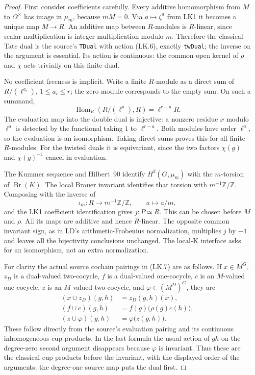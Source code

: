 \begin{proof}
First consider coefficients carefully.  Every additive homomorphism
from $M$ to $\Omega^\times$ has image in $\mu_m$, because $mM=0$.
Via $a\mapsto\zeta^a$ from LK1 it becomes a unique map $M\to R$.
An additive map between $R$-modules is $R$-linear, since scalar
multiplication is integer multiplication modulo $m$.  Therefore
the classical Tate dual is the source's \texttt{TDual} with action
(LK.6), exactly \texttt{twDual}; the inverse on the argument is
essential.  Its action is continuous: the common open kernel of
$\rho$ and $\chi$ acts trivially on this finite dual.

No coefficient freeness is implicit.  Write a finite $R$-module as
a direct sum of $R/(\ell^{a_i})$, $1\le a_i\le r$; the zero module
corresponds to the empty sum.  On such a summand,
\[
 \operatorname{Hom}_R(R/(\ell^a),R)=\ell^{r-a}R.
 \tag{LK.8}
\]
The evaluation map into the double dual is injective: a nonzero
residue $x$ modulo $\ell^a$ is detected by the functional taking
$1$ to $\ell^{r-a}$.  Both modules have order $\ell^a$, so the
evaluation is an isomorphism.  Taking direct sums proves this for
all finite $R$-modules.  For the twisted duals it is equivariant,
since the two factors $\chi(g)$ and $\chi(g)^{-1}$ cancel in
evaluation.

The Kummer sequence and Hilbert~90 identify
$H^2(G,\mu_m)$ with the $m$-torsion of $\operatorname{Br}(K)$.
The local Brauer invariant identifies that torsion with
$m^{-1}\mathbb Z/\mathbb Z$.  Composing with the inverse of
\[
 \iota_m:R\longrightarrow m^{-1}\mathbb Z/\mathbb Z,
 \qquad a\longmapsto a/m,
 \tag{LK.9}
\]
and the LK1 coefficient identification gives $j:P\simeq R$.
This can be chosen before $M$ and $\rho$.  All its maps are additive
and hence $R$-linear.  The opposite common invariant sign, as in
LD's arithmetic-Frobenius normalization, multiplies $j$ by $-1$ and
leaves all the bijectivity conclusions unchanged.  The local-K
interface asks for an isomorphism, not an extra normalization.

For clarity the actual source cochain pairings in (LK.7) are as
follows.  If $x\in M^G$, $z_D$ is a dual-valued two-cocycle,
$f$ is a dual-valued one-cocycle, $c$ is an $M$-valued one-cocycle,
$z$ is an $M$-valued two-cocycle, and $\varphi\in(M^D)^G$, they are
\[
\begin{aligned}
  (x\cup z_D)(g,h)&=z_D(g,h)(x),\\
  (f\cup c)(g,h)&=f(g)\bigl(\rho(g)c(h)\bigr),\\
  (z\cup\varphi)(g,h)&=\varphi\bigl(z(g,h)\bigr).
\end{aligned}
\tag{LK.10}
\]
These follow directly from the source's evaluation pairing and its
continuous inhomogeneous cup products.  In the last formula the
usual action of $gh$ on the degree-zero second argument disappears
because $\varphi$ is invariant.  Thus these are the classical cup
products before the invariant, with the displayed order of the
arguments; the degree-one source map puts the dual first.


\end{proof}
